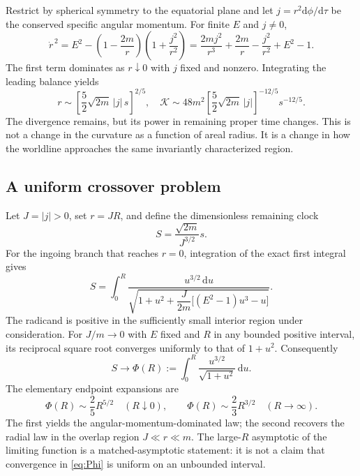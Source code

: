 \documentclass[11pt,letterpaper]{article}
\newcommand{\dd}{\mathrm{d}}
\newcommand{\Kretsch}{\mathcal K}
\theoremstyle{definition}
\theoremstyle{remark}
\begin{document}
Restrict by spherical symmetry to the equatorial plane and let
$j=r^2\dd\phi/\dd\tau$ be the conserved specific angular momentum. For finite
$E$ and $j\ne0$,
\begin{equation}
 \dot r^{\,2}=E^2-
    \left(1-\frac{2m}{r}\right)\left(1+\frac{j^2}{r^2}\right)
 =\frac{2mj^2}{r^3}+\frac{2m}{r}-\frac{j^2}{r^2}+E^2-1.
 \label{eq:radialgeneral}
\end{equation}
The first term dominates as $r\downarrow0$ with $j$ fixed and nonzero.
Integrating the leading balance yields
\begin{equation}
 r\sim\left[\frac52\sqrt{2m}\,|j|\,s\right]^{2/5},
 \quad
 \Kretsch\sim
 48m^2\left[\frac52\sqrt{2m}\,|j|\right]^{-12/5}s^{-12/5}.
 \label{eq:nonradial}
\end{equation}
The divergence remains, but its power in remaining proper time changes. This
is not a change in the curvature as a function of areal radius. It is a change
in how the worldline approaches the same invariantly characterized region.

\subsection{A uniform crossover problem}

Let $J=|j|>0$, set $r=JR$, and define the dimensionless remaining clock
\[
 S=\frac{\sqrt{2m}}{J^{3/2}}s.
\]
For the ingoing branch that reaches $r=0$, integration of the exact first
integral gives
\begin{equation}
 S=\int_0^R
 \frac{u^{3/2}\,\dd u}
 {\sqrt{1+u^2+\dfrac{J}{2m}\bigl[(E^2-1)u^3-u\bigr]}}.
 \label{eq:crossoverexact}
\end{equation}
The radicand is positive in the sufficiently small interior region under
consideration. For $J/m\to0$ with $E$ fixed and $R$ in any bounded positive
interval, its reciprocal square root converges uniformly to that of $1+u^2$.
Consequently
\begin{equation}
 S\longrightarrow\Phi(R):=
   \int_0^R\frac{u^{3/2}}{\sqrt{1+u^2}}\,\dd u.
 \label{eq:Phi}
\end{equation}
The elementary endpoint expansions are
\begin{equation}
 \Phi(R)\sim\frac25R^{5/2}\quad(R\downarrow0),
 \qquad
 \Phi(R)\sim\frac23R^{3/2}\quad(R\to\infty).
 \label{eq:Philimits}
\end{equation}
The first yields the angular-momentum-dominated law; the second recovers the
radial law in the overlap region $J\ll r\ll m$. The large-$R$ asymptotic of the
limiting function is a matched-asymptotic statement: it is not a claim that
convergence in \eqref{eq:Phi} is uniform on an unbounded interval.
\end{document}

